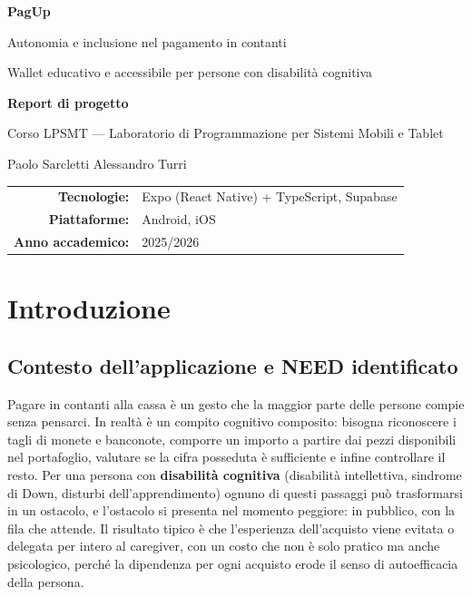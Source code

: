 \documentclass[11pt,a4paper]{article}
\begin{document}
\begin{titlepage}
\centering
\vspace*{2cm}
{\Huge\bfseries\color{pagprimary} PagUp\par}
\vspace{0.4cm}
{\large Autonomia e inclusione nel pagamento in contanti\par}
\vspace{0.2cm}
{\normalsize Wallet educativo e accessibile per persone con disabilit\`a cognitiva\par}
\vspace{2cm}
{\large\bfseries Report di progetto\par}
{\large Corso LPSMT --- Laboratorio di Programmazione per Sistemi Mobili e Tablet\par}
\vspace{2.5cm}
{\Large Paolo Sarcletti \quad\textperiodcentered\quad Alessandro Turri\par}
\vspace{2cm}
\begin{tabular}{rl}
\textbf{Tecnologie:} & Expo (React Native) + TypeScript, Supabase \\[4pt]
\textbf{Piattaforme:} & Android, iOS \\[4pt]
\textbf{Anno accademico:} & 2025/2026 \\
\end{tabular}
\vfill
\end{titlepage}

\tableofcontents
\newpage

\section{Introduzione}

\subsection{Contesto dell'applicazione e NEED identificato}

Pagare in contanti alla cassa \`e un gesto che la maggior parte delle persone compie senza
pensarci. In realt\`a \`e un compito cognitivo composito: bisogna riconoscere i tagli di monete e
banconote, comporre un importo a partire dai pezzi disponibili nel portafoglio, valutare se la
cifra posseduta \`e sufficiente e infine controllare il resto. Per una persona con
\textbf{disabilit\`a cognitiva} (disabilit\`a intellettiva, sindrome di Down, disturbi
dell'apprendimento) ognuno di questi passaggi pu\`o trasformarsi in un ostacolo, e l'ostacolo si
presenta nel momento peggiore: in pubblico, con la fila che attende. Il risultato tipico \`e che
l'esperienza dell'acquisto viene evitata o delegata per intero al caregiver, con un costo che non
\`e solo pratico ma anche psicologico, perch\'e la dipendenza per ogni acquisto erode il senso di
autoefficacia della persona.
\end{document}
